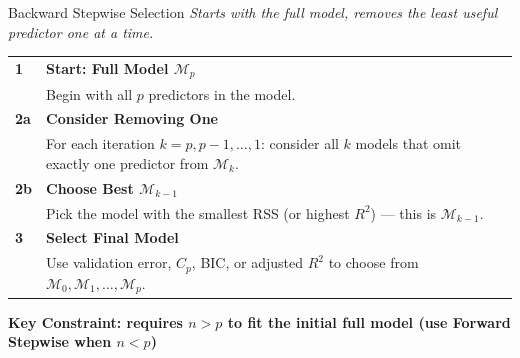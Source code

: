 \documentclass[ignorenonframetext,]{beamer}
\begin{document}
\begin{frame}{Backward Stepwise Selection}
\emph{Starts with the full model, removes the least useful predictor one at a time.}

\footnotesize
\begin{tabular}{@{}p{}p{}@{}}
\toprule
\textbf{1} & \textbf{Start: Full Model $\mathcal{M}_p$}\\
& Begin with all $p$ predictors in the model.\\
\midrule
\textbf{2a} & \textbf{Consider Removing One}\\
& For each iteration $k = p, p-1, \ldots, 1$: consider all $k$ models that omit exactly one predictor from $\mathcal{M}_k$.\\
\midrule
\textbf{2b} & \textbf{Choose Best $\mathcal{M}_{k-1}$}\\
& Pick the model with the smallest RSS (or highest $R^2$) --- this is $\mathcal{M}_{k-1}$.\\
\midrule
\textbf{3} & \textbf{Select Final Model}\\
& Use validation error, $C_p$, BIC, or adjusted $R^2$ to choose from $\mathcal{M}_0, \mathcal{M}_1, \ldots, \mathcal{M}_p$.\\
\bottomrule
\end{tabular}

\vspace{6pt}
\begin{exampleblock}{}
\small\textbf{Key Constraint: requires $n > p$ to fit the initial full model (use Forward Stepwise when $n < p$)}
\end{exampleblock}
\end{frame}
\end{document}
